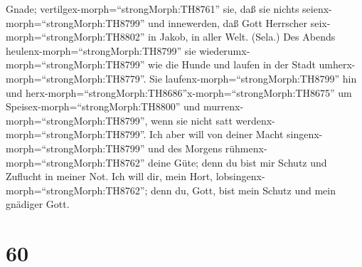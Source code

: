 Gnade; vertilgex-morph=``strongMorph:TH8761'' sie, daß sie nichts
seienx-morph=``strongMorph:TH8799'' und innewerden, daß Gott Herrscher
seix-morph=``strongMorph:TH8802'' in Jakob, in aller Welt. (Sela.)
 Des Abends heulenx-morph=``strongMorph:TH8799'' sie
wiederumx-morph=``strongMorph:TH8799'' wie die Hunde und laufen in der
Stadt umherx-morph=``strongMorph:TH8779''.  Sie
laufenx-morph=``strongMorph:TH8799'' hin und
herx-morph=``strongMorph:TH8686''\textbar x-morph=``strongMorph:TH8675''
um Speisex-morph=``strongMorph:TH8800'' und
murrenx-morph=``strongMorph:TH8799'', wenn sie nicht satt
werdenx-morph=``strongMorph:TH8799''.  Ich aber will von
deiner Macht singenx-morph=``strongMorph:TH8799'' und des Morgens
rühmenx-morph=``strongMorph:TH8762'' deine Güte; denn du bist mir Schutz
und Zuflucht in meiner Not.  Ich will dir, mein Hort,
lobsingenx-morph=``strongMorph:TH8762''; denn du, Gott, bist mein Schutz
und mein gnädiger Gott.

\hypertarget{section-59}{%
\section{60}\label{section-59}}

